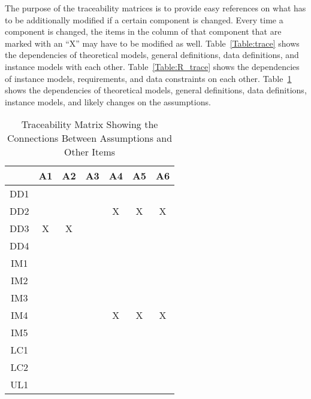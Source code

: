 \documentclass[12pt]{article}
\begin{document}
The purpose of the traceability matrices is to provide easy references on what has to be additionally modified if a certain component is changed.  Every time a component is changed, the items in the column of that component that are marked with an ``X'' may have to be modified as well. Table~\ref{Table:trace} shows the dependencies of theoretical models, general definitions, data definitions, and instance models with each other. Table~\ref{Table:R_trace} shows the dependencies of instance models, requirements, and data constraints on each other. Table~\ref{Table:A_trace} shows the dependencies of theoretical models, general definitions, data definitions, instance models, and likely changes on the assumptions.

\begin{table}[htbp]
\centering
\begin{tabular}{|c|c|c|c|c|c|c|}
\hline
 & A1 & A2 &  A3& A4 & A5 & A6 \\
\hline
DD1 &  &  &  &  &  &  \\ \hline
DD2 &  &  &  & X & X & X \\ \hline
DD3 & X & X &  &  &  &  \\ \hline
DD4 &  &  &  &  &  &  \\ \hline
IM1 &  &  &  &  &  &  \\ \hline
IM2 &  &  &  &  &  &  \\ \hline
IM3 &  &  &  &  &  &  \\ \hline
IM4&  &  &  & X & X & X \\ \hline
IM5 &  &  &  &  &  &  \\ \hline
LC1 &  &  &  &  &  &  \\ \hline
LC2 &  &  &  &  &  &  \\ \hline
UL1 &  &  &  &  &  &  \\ \hline
\end{tabular}
\caption{Traceability Matrix Showing the Connections Between Assumptions and Other Items}
\label{Table:A_trace}
\end{table}
\newpage
\end{document}
